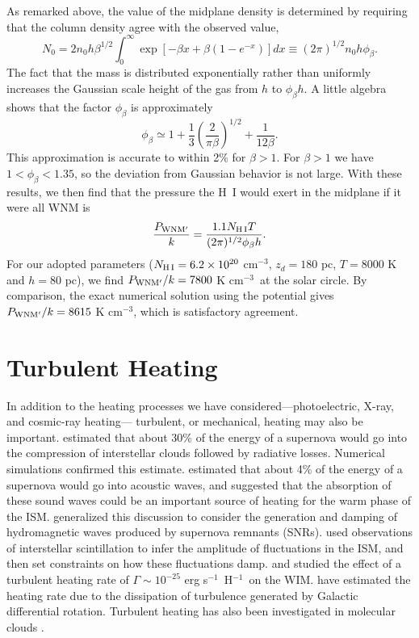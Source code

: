 \documentclass[12pt,preprint,flushrt]{aastex}
\newcommand{\beq}{\begin{equation}}
\newcommand{\eeq}{\end{equation}}
\newcommand{\e}{$^{-1}$}
\newcommand{\eee}{$^{-3}$}
\begin{document}
      As remarked above, the value of the midplane density is determined
by requiring that the column density agree with the observed value,
\beq
N_0=2n_0 h \beta^{1/2}\int_0^\infty
      \exp\left[-\beta x+\beta(1-e^{-x})\right] dx \equiv
      (2\pi)^{1/2}n_0 h\phi_\beta.
\label{eq:s0}
\eeq
The fact that the mass is distributed exponentially rather than
uniformly increases
the Gaussian scale height of the gas from
$h$ to $\phi_\beta h$.
A little algebra shows that the factor $\phi_\beta$ is approximately
\beq
\phi_\beta\simeq 1+\frac 13 \left(\frac{2}{\pi\beta}\right)^{1/2}
    +\frac{1}{12\beta}.
\eeq
This approximation is accurate to within 2\% for $\beta>1$.
For $\beta>1$ we have $1<\phi_\beta<1.35$, so the deviation
from Gaussian behavior is not large.
With these results, we then find that the pressure the H~I would
exert in the midplane if it were all WNM is
\beq
\frac{P_{\rm WNM'}}{k}=\frac{1.1 N_{\rm H\,I} T}{(2\pi)^{1/2}
        \phi_\beta h}.
\eeq
For our adopted parameters ($N_{\rm H\,I}=6.2\times 10^{20}$ cm\eee,
$z_d=180$ pc, $T=8000$ K and $h=80$ pc), we find
$P_{\rm WNM'}/k=7800$ K cm\eee\ at the solar circle.  By comparison,
the exact numerical
solution using the \cite{deh98} potential gives
$P_{\rm WNM'}/k=8615$ K cm\eee, which is satisfactory agreement.

\section{Turbulent Heating}\label{appen:turbheating}

In addition to the heating processes we have
considered---photoelectric, X-ray, and cosmic-ray heating---
turbulent, or mechanical, heating may also be important.
\cite{cox79}  estimated that about 30\% of the energy of a
supernova would go into the compression of interstellar
clouds followed by radiative losses.
Numerical simulations \citep{cowie81}
confirmed this estimate. \cite{spi82}  estimated
that about 4\% of the energy of a supernova would go into
acoustic waves, and suggested that the absorption of these
sound waves could be an important source of heating for
the warm phase of the ISM.  \cite{fer88}  generalized
this discussion to consider the generation and damping
of hydromagnetic waves produced by supernova remnants (SNRs).
\cite{mint97}  used observations of interstellar
scintillation to infer the amplitude of fluctuations in the
ISM, and then set constraints on how these fluctuations
damp.  \cite{mintbal97} and \cite{mathis00} studied
the effect of a turbulent heating rate of $\Gamma\sim 10^{-25}$
erg s\e\ H\e\ on the WIM.  \cite{sel99}  have
estimated the heating rate due to the dissipation of turbulence
generated by Galactic differential rotation.
Turbulent heating has also
been investigated in molecular clouds \citep[e.g.,][]{sto98,mac99}.
\end{document}
